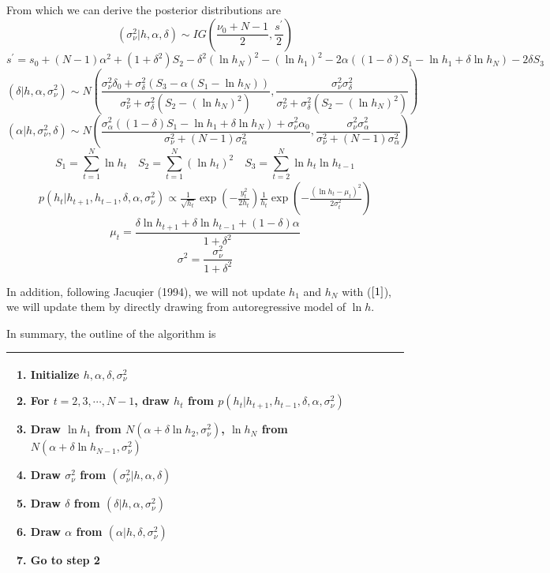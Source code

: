 \documentclass{article}
\begin{document}
From which we can derive the posterior distributions are
\[
(\sigma_\nu^2|h,\alpha,\delta)\sim IG\left(\frac{\nu_0+N-1}{2},\frac{s^\prime}{2}\right)
\]
\[
s^\prime=s_0+(N-1)\alpha^2+(1+\delta^2)S_2-\delta^2(\ln h_N)^2-(\ln h_1)^2-2\alpha((1-\delta)S_1-\ln h_1+\delta\ln h_N)-2\delta S_3
\]
\[
(\delta|h,\alpha,\sigma_\nu^2)\sim N\left(\frac{\sigma_\nu^2\delta_0+\sigma_\delta^2(S_3-\alpha(S_1-\ln h_N))}{\sigma_\nu^2+\sigma_\delta^2(S_2-(\ln h_N)^2)},\frac{\sigma_\nu^2\sigma_\delta^2}{\sigma_\nu^2+\sigma_\delta^2(S_2-(\ln h_N)^2)}\right)
\]
\[
(\alpha|h,\sigma_\nu^2,\delta)\sim N\left(\frac{\sigma_\alpha^2((1-\delta)S_1-\ln h_1+\delta\ln h_N)+\sigma_\nu^2\alpha_0}{\sigma_\nu^2+(N-1)\sigma_\alpha^2},\frac{\sigma_\nu^2\sigma_\alpha^2}{\sigma_\nu^2+(N-1)\sigma_\alpha^2}\right)
\]
\[
S_1=\sum_{t=1}^N\ln h_t\quad S_2=\sum_{t=1}^N(\ln h_t)^2\quad S_3=\sum_{t=2}^N \ln h_t\ln h_{t-1}
\]
\begin{eqnarray}\label{1}
p(h_t|h_{t+1},h_{t-1},\delta,\alpha,\sigma_\nu^2)\propto\frac{1}{\sqrt{h_t}}\exp\left(-\frac{y_t^2}{2h_t}\right)\frac{1}{h_t}\exp\left(-\frac{(\ln h_t-\mu_t)^2}{2\sigma_t^2}\right)
\end{eqnarray}
\[
\mu_t=\frac{\delta\ln h_{t+1}+\delta\ln h_{t-1}+(1-\delta)\alpha}{1+\delta^2}
\]
\[
\sigma^2=\frac{\sigma_\nu^2}{1+\delta^2}
\]

In addition, following Jacuqier (1994), we will not update $h_1$ and $h_N$ with ($\ref{1}$), we will update them by directly drawing from autoregressive model of $\ln h$.

In summary, the outline of the algorithm is

\begin{tabular}{|p{11cm}|}
\hline
\begin{enumerate}
\item
Initialize $h, \alpha,\delta,\sigma_\nu^2$
\item
For $t=2,3,\cdots,N-1$, draw $h_t$ from  $p(h_t|h_{t+1},h_{t-1},\delta,\alpha,\sigma_\nu^2)$
\item
Draw $\ln h_1$ from $N(\alpha+\delta\ln h_2, \sigma_\nu^2)$, $\ln h_N$ from $N(\alpha+\delta\ln h_{N-1}, \sigma_\nu^2)$
\item
Draw $\sigma_\nu^2$ from $(\sigma_\nu^2|h,\alpha,\delta)$
\item
Draw $\delta$ from $(\delta|h,\alpha,\sigma_\nu^2)$
\item
Draw $\alpha$ from $(\alpha|h,\delta,\sigma_\nu^2)$
\item
Go to step 2
\end{enumerate}\\
\hline
\end{tabular}
\end{document}
